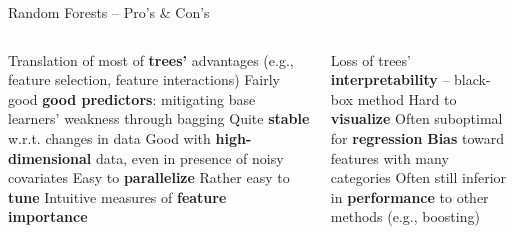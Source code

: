 \begin{frame}{Random Forests -- Pro's \& Con's}

\begin{columns}[onlytextwidth]
  \begin{column}{0.5\textwidth}
    \footnotesize
    \begin{itemize}
      \positem Translation of most of \textbf{trees'} advantages (e.g., 
      feature selection, feature interactions)
      \positem Fairly good \textbf{good predictors}: mitigating base learners' 
      weakness through bagging
      \positem Quite \textbf{stable} w.r.t. changes in data
      \positem Good with \textbf{high-dimensional} data, even in presence of 
      noisy covariates
      \positem Easy to \textbf{parallelize}
      \positem Rather easy to \textbf{tune}
      \positem Intuitive measures of \textbf{feature importance}
    \end{itemize}
  \end{column}
  \begin{column}{0.5\textwidth}
    \footnotesize
    \begin{itemize}
      \negitem Loss of trees' \textbf{interpretability} -- black-box 
      method
      \negitem Hard to \textbf{visualize}
      \negitem Often suboptimal for \textbf{regression}
      \negitem \textbf{Bias} toward features with many categories
      \negitem Often still inferior in \textbf{performance} to other methods 
      (e.g., boosting)
    \end{itemize}
  \end{column}
\end{columns}

\vfill

\small


\end{frame}


